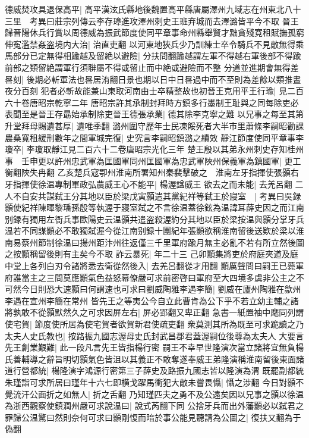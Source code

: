 德威焚攻具退保高平|{
	高平漢泫氏縣地後魏置高平縣唐屬澤州九域志在州東北八十三里　考異曰莊宗列傳云李存璋進攻澤州刺史王班弃城而去澤潞皆平今不取}
晉王歸晉陽休兵行賞以周德威為振武節度使同平章事命州縣舉賢才黜貪殘寛租賦撫孤窮伸寃濫禁姦盗境内大治|{
	治直吏翻}
以河東地狹兵少乃訓練士卒令騎兵不見敵無得乘馬部分已定無得相踰越及留絶以避險|{
	分扶問翻踰越謂左軍不得越右軍後部不得踰前部之類留絶謂軍行須聨屬不得或留止而中絶或避險而不整}
分道並進期會無得差晷刻|{
	後期必斬軍法也晷居洧翻日景也期以日中日晷過中而不至則為差餘以類推晝夜分百刻}
犯者必斬故能兼山東取河南由士卒精整故也初晉王克用平王行瑜|{
	見二百六十卷唐昭宗乾寧二年}
唐昭宗許其承制封拜時方鎮多行墨制王耻與之同每除吏必表聞至是晉王存朂始承制除吏晉王德張承業|{
	德其除李克寧之難}
以兄事之每至其第升堂拜母賜遺甚厚|{
	遺唯季翻}
潞州圍守歷年士民凍餒死者大半市里蕭條李嗣昭勸課農桑寛租緩刑數年之間軍城完復|{
	史究言李嗣昭鎮潞之績效}
靜江節度使同平章事李瓊卒|{
	李瓊取靜江見二百六十二卷唐昭宗光化三年}
楚王殷以其弟永州刺史存知桂州事　壬申更以許州忠武軍為匡國軍同州匡國軍為忠武軍陜州保義軍為鎮國軍|{
	更工衡翻陜失冉翻}
乙亥楚兵寇卾州淮南所署知州秦裴擊破之　淮南左牙指揮使張顥右牙指揮使徐温專制軍政弘農威王心不能平|{
	楊渥諡威王}
欲去之而未能|{
	去羌呂翻}
二人不自安共謀弑王分其地以臣於梁戊寅顥遣其黨紀祥等弑王於寢室　|{
	考異曰吳録顥使紀祥陳暉黎璠孫殷等執渥于寢室弑之不言徐温蓋徐鉉為温諱耳薛史因之而江南别録有獨用左衙兵事歐陽史云温顥共遣盗殺渥約分其地以臣於梁按温與顥分掌牙兵温若不同謀顥必不敢獨弑渥今從江南别録十團紀年張顥欲稱淮南留後送欵於梁以淮南易蔡州節制徐温曰揚州距汴州往返僅三千里軍府踰月無主必亂不若有所立然後圖之按顥稱留後則有主矣今不取}
詐云暴死|{
	年二十三}
己卯顥集將吏於府庭夾道及庭中堂上各列白刃令諸將悉去衛從然後入|{
	去羌呂翻從才用翻}
顥厲聲問曰嗣王已薨軍府誰當主之三問莫應顥氣色益怒幕僚嚴可求前密啓曰軍府至大四境多虞非公主之不可然今日則恐大速顥曰何謂速也可求曰劉威陶雅李遇李簡|{
	劉威在廬州陶雅在歙州李遇在宣州李簡在常州}
皆先王之等夷公今自立此曹肯為公下乎不若立幼主輔之諸將孰敢不從顥默然久之可求因屏左右|{
	屏必郢翻又卑正翻}
急書一紙置袖中麾同列謂使宅賀|{
	節度使所居為使宅賀者欲賀新君使疏吏翻}
衆莫測其所為既至可求跪讀之乃太夫人史氏教也|{
	按路振九國志渥母史氏封武昌郡君蓋渥嗣位後尊為太夫人}
大要言先王創業艱難|{
	此一段凡言先王皆指楊行密}
嗣王不幸早世隆演次當立諸將宜無負楊氏善輔導之辭旨明切顥氣色皆沮以其義正不敢奪遂奉威王弟隆演稱淮南留後東面諸道行營都統|{
	楊隆演字鴻源行密第三子薛史及路振九國志皆以隆演為渭}
既罷副都統朱瑾詣可求所居曰瑾年十六七即横戈躍馬衝犯大敵未嘗畏懾|{
	懾之涉翻}
今日對顥不覺流汗公面折之如無人|{
	折之舌翻}
乃知瑾匹夫之勇不及公遠矣因以兄事之顥以徐温為浙西觀察使鎮潤州嚴可求說温曰|{
	說式芮翻下同}
公捨牙兵而出外藩顥必以弑君之罪歸公温驚曰然則奈何可求曰顥剛愎而暗於事公能見聽請為公圖之|{
	復扶又翻為于偽翻}
